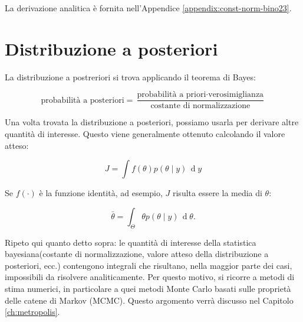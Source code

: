 \documentclass[
  11pt,
]{krantz}
\makeatletter
\newenvironment{Shaded}{\begin{snugshade}}{\end{snugshade}}
\newcommand{\AttributeTok}[1]{\textcolor[rgb]{0.61,0.61,0.61}{#1}}
\newcommand{\CommentTok}[1]{\textcolor[rgb]{0.37,0.37,0.37}{\textit{#1}}}
\newcommand{\ControlFlowTok}[1]{\textcolor[rgb]{0.27,0.27,0.27}{\textbf{#1}}}
\newcommand{\DecValTok}[1]{\textcolor[rgb]{0.06,0.06,0.06}{#1}}
\newcommand{\FunctionTok}[1]{\textcolor[rgb]{0,0,0}{#1}}
\newcommand{\NormalTok}[1]{#1}
\newcommand{\OtherTok}[1]{\textcolor[rgb]{0.37,0.37,0.37}{#1}}
\newcommand{\SpecialCharTok}[1]{\textcolor[rgb]{0,0,0}{#1}}
\newenvironment{kframe}{%
\medskip{}
\setlength{\fboxsep}{.8em}
 \def\at@end@of@kframe{}%
 \ifinner\ifhmode%
  \def\at@end@of@kframe{\end{minipage}}%
  \begin{minipage}{\columnwidth}%
 \fi\fi%
 \def\FrameCommand##1{\hskip\@totalleftmargin \hskip-\fboxsep
 \colorbox{shadecolor}{##1}\hskip-\fboxsep
     \hskip-\linewidth \hskip-\@totalleftmargin \hskip\columnwidth}%
 \MakeFramed {\advance\hsize-\width
   \@totalleftmargin\z@ \linewidth\hsize
   \@setminipage}}%
 {\par\unskip\endMakeFramed%
 \at@end@of@kframe}
\renewenvironment{Shaded}{\begin{kframe}}{\end{kframe}}
\theoremstyle{definition}
\theoremstyle{definition}
\theoremstyle{definition}
\theoremstyle{definition}
\theoremstyle{remark}
\makeatother
\begin{document}
\begin{Shaded}
\end{Shaded}

La derivazione analitica è fornita nell'Appendice \ref{appendix:const-norm-bino23}.

\hypertarget{distribuzione-a-posteriori}{%
\section{Distribuzione a posteriori}\label{distribuzione-a-posteriori}}

La distribuzione a postreriori si trova applicando il teorema di Bayes:

\[
\text{probabilità a posteriori} = \frac{\text{probabilità a priori} \cdot \text{verosimiglianza}}{\text{costante di normalizzazione}}
\]

Una volta trovata la distribuzione a posteriori, possiamo usarla per derivare altre quantità di interesse. Questo viene generalmente ottenuto calcolando il valore atteso:

\[
J = \int f(\theta) p(\theta \mid y) \,\operatorname {d}\!y
\]

Se \(f(\cdot)\) è la funzione identità, ad esempio, \(J\) risulta essere la media di \(\theta\):

\[
\bar{\theta} = \int_{\Theta} \theta p(\theta \mid y) \,\operatorname {d}\!\theta .
\]

Ripeto qui quanto detto sopra: le quantità di interesse della statistica bayesiana(costante di normalizzazione, valore atteso della distribuzione a posteriori, ecc.) contengono integrali che risultano, nella maggior parte dei casi, impossibili da risolvere analiticamente. Per questo motivo, si ricorre a metodi di stima numerici, in particolare a quei metodi Monte Carlo basati sulle proprietà delle catene di Markov (MCMC). Questo argomento verrà discusso nel Capitolo \ref{ch:metropolis}.
\end{document}
